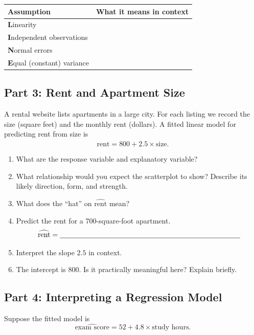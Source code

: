 \documentclass{article}
\newcommand{\blankline}[1]{\underline{\hspace{#1}}}
\begin{document}
\begin{center}
\renewcommand{\arraystretch}{1.45}
\begin{tabularx}{\textwidth}{p{4.3cm}X}
\toprule
\textbf{Assumption} & \textbf{What it means in context} \\
\midrule
\textbf{L}inearity & \\[2em]
\textbf{I}ndependent observations & \\[2em]
\textbf{N}ormal errors & \\[2em]
\textbf{E}qual (constant) variance & \\
\bottomrule
\end{tabularx}
\end{center}

\subsection*{Part 3: Rent and Apartment Size}
A rental website lists apartments in a large city. For each listing we record the size (square feet) and the monthly rent (dollars). A fitted linear model for predicting rent from size is
\[
\widehat{\text{rent}} = 800 + 2.5\times \text{size}.
\]

\begin{enumerate}[label={\bfseries (\Alph*)},itemsep=.75em]
\item What are the response variable and explanatory variable? \\[3em]
\item What relationship would you expect the scatterplot to show? Describe its likely direction, form, and strength. \\[3em]
\item What does the ``hat'' on $\widehat{\text{rent}}$ mean? \\[2.5em]
\item Predict the rent for a 700-square-foot apartment.
\[
\widehat{\text{rent}} = \blankline{3.5in}
\]
\item Interpret the slope $2.5$ in context. \\[3em]
\item The intercept is $800$. Is it practically meaningful here? Explain briefly. \\[3em]
\end{enumerate}

\subsection*{Part 4: Interpreting a Regression Model}
Suppose the fitted model is
\[
\widehat{\text{exam score}} = 52 + 4.8 \times \text{study hours}.
\]
\end{document}
